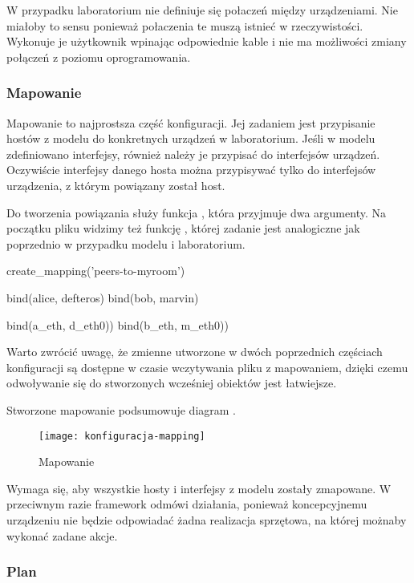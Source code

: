 \documentclass[00-praca-magisterska.tex]{subfiles}
\begin{document}
W przypadku laboratorium nie definiuje się połaczeń między urządzeniami. Nie
miałoby to sensu ponieważ połaczenia te muszą istnieć w rzeczywistości.
Wykonuje je użytkownik wpinając odpowiednie kable i nie ma możliwości zmiany
połączeń z poziomu oprogramowania.

\subsubsection{Mapowanie}

Mapowanie to najprostsza część konfiguracji. Jej zadaniem jest przypisanie
hostów z modelu do konkretnych urządzeń w laboratorium. Jeśli w modelu
zdefiniowano interfejsy, również należy je przypisać do interfejsów urządzeń.
Oczywiście interfejsy danego hosta można przypisywać tylko do interfejsów
urządzenia, z którym powiązany został host.

Do tworzenia powiązania służy funkcja , która przyjmuje dwa
argumenty. Na początku pliku widzimy też funkcję , której
zadanie jest analogiczne jak poprzednio w przypadku modelu i laboratorium.

\begin{pythoncode}
  create_mapping('peers-to-myroom')

  bind(alice, defteros)
  bind(bob,   marvin)

  bind(a_eth, d_eth0))
  bind(b_eth, m_eth0))
\end{pythoncode}

Warto zwrócić uwagę, że zmienne utworzone w dwóch poprzednich częściach
konfiguracji są dostępne w czasie wczytywania pliku z mapowaniem, dzięki czemu
odwoływanie się do stworzonych wcześniej obiektów jest łatwiejsze.

Stworzone mapowanie podsumowuje diagram .

\begin{figure}[htb]
\begin{center}
\leavevmode
\texttt{[image: konfiguracja-mapping]}
\end{center}
\caption{Mapowanie}
\label{fig:konfiguracja-mapping}
\end{figure}

Wymaga się, aby wszystkie hosty i interfejsy z modelu zostały zmapowane. W
przeciwnym razie framework odmówi działania, ponieważ koncepcyjnemu urządzeniu
nie będzie odpowiadać żadna realizacja sprzętowa, na której możnaby wykonać
zadane akcje.

\subsubsection{Plan}
\end{document}
